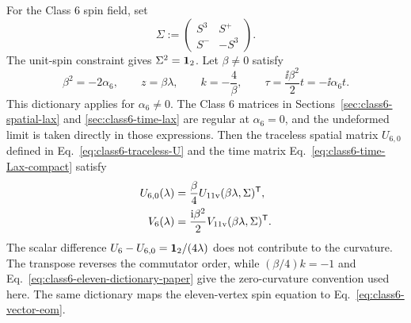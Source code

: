 For the Class 6 spin field, set
\begin{equation}
\Sigma:=
\begin{pmatrix}
S^3&S^+\\
S^-&-S^3
\end{pmatrix}.
\label{eq:class6-eleven-spin-matrix}
\end{equation}
The unit-spin constraint gives $\Sigma^2=\mathbf{1}_2$.  Let $\beta\ne0$ satisfy
\begin{equation}
\beta^2=-2\alpha_6,
\qquad
z=\beta\lambda,
\qquad
k=-\frac{4}{\beta},
\qquad
\tau=\frac{\ii\beta^2}{2}t=-\ii\alpha_6t.
\label{eq:class6-eleven-dictionary-paper}
\end{equation}
This dictionary applies for $\alpha_6\ne0$.  The Class 6 matrices in
Sections~\ref{sec:class6-spatial-lax} and \ref{sec:class6-time-lax} are
regular at $\alpha_6=0$, and the undeformed limit is taken directly in those
expressions.  Then the traceless spatial matrix $U_{6,0}$ defined in
Eq.~\eqref{eq:class6-traceless-U} and the time matrix
Eq.~\eqref{eq:class6-time-Lax-compact} satisfy
\begin{align}
U_{6,0}(\lambda)
&=\frac{\beta}{4}
U_{\rm 11v}(\beta\lambda,\Sigma)^{\mathsf T},
\label{eq:class6-eleven-U-map-paper}\\
V_6(\lambda)
&=\frac{\mathrm{i}\beta^2}{2}
V_{\rm 11v}(\beta\lambda,\Sigma)^{\mathsf T}.
\label{eq:class6-eleven-V-map-paper}
\end{align}
The scalar difference $U_6-U_{6,0}=\mathbf{1}_2/(4\lambda)$ does not contribute to
the curvature.  The transpose reverses the commutator order, while
$(\beta/4)k=-1$ and Eq.~\eqref{eq:class6-eleven-dictionary-paper} give the
zero-curvature convention used here.  The same dictionary maps the
eleven-vertex spin equation to Eq.~\eqref{eq:class6-vector-eom}.

